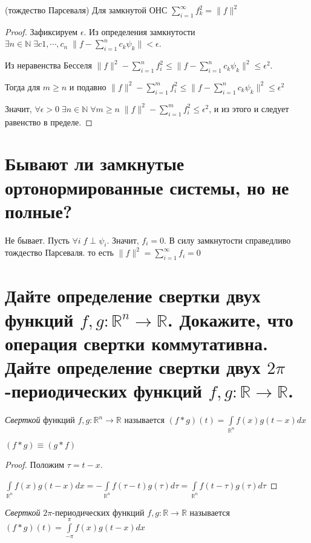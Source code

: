 \documentclass{article}
\begin{document}
	\begin{theorem} 
		(тождество Парсеваля) Для замкнутой ОНС  $\sum_{i=1}^{\infty} f_k^2 = \| f \|^2$ 
	\end{theorem}
	\begin{proof}
		Зафиксируем $\epsilon$.
		Из определения замкнутости $\exists n \in \mathbb{N} \; \exists c1, \cdots, c_n \; \| f-\sum_{i=1}^{n} c_k \psi_k\| < \epsilon$. 
		
		Из неравенства Бесселя $\|f\|^2-\sum_{i=1}^{n} f_i ^2 \le \| f-\sum_{i=1}^{n} c_k \psi_k\|^2 \le \epsilon^2$. 
		
		Тогда для $m \ge n$ и подавно $\|f\|^2-\sum_{i=1}^{m} f_i ^2 \le \| f-\sum_{i=1}^{n} c_k \psi_k\|^2 \le \epsilon^2$
		
		Значит, $\forall \epsilon > 0 \; \exists n \in \mathbb{N} \; \forall m \ge n \; \|f\|^2-\sum_{i=1}^{m} f_i ^2 \le \epsilon^2$, и из этого и следует равенство в пределе.
	\end{proof}
	
	\section{Бывают ли замкнутые ортонормированные системы, но не полные?}
	
	Не бывает. Пусть $\forall i \; f\perp \psi_i$. Значит, $f_i=0$. В силу замкнутости справедливо тождество Парсеваля. то есть $\|f\|^2=\sum_{i=1}^{\infty}f_i=0$
	
	\section{Дайте определение свертки двух функций $f, g: \mathbb{R}^n \to \mathbb{R}$. Докажите, что операция свертки коммутативна. Дайте определение свертки двух $2\pi$-периодических функций $f, g: \mathbb{R} \to \mathbb{R}$.}
	
	\begin{definition}
		\textit{Сверткой} функций $f, g: \mathbb{R}^n \to \mathbb{R}$ называется $(f*g)(t)=\int\limits_{\mathbb{R}^n} f(x)g(t-x)dx$
	\end{definition}

	\begin{theorem} 
		$(f*g) \equiv (g*f)$ 
	\end{theorem}
	\begin{proof}
		Положим $\tau=t-x$.
		
		$\int\limits_{\mathbb{R}^n} f(x)g(t-x)dx=-\int\limits_{\mathbb{R}^n} f(\tau-t)g(\tau)d\tau=\int\limits_{\mathbb{R}^n} f(t-\tau)g(\tau)d\tau$
	\end{proof}
	\begin{definition}
		\textit{Сверткой} $2\pi$-периодических функций $f, g: \mathbb{R} \to \mathbb{R}$ называется $(f*g)(t)=\int\limits_{-\pi}^{\pi} f(x)g(t-x)dx$
	\end{definition}
	
\end{document}

